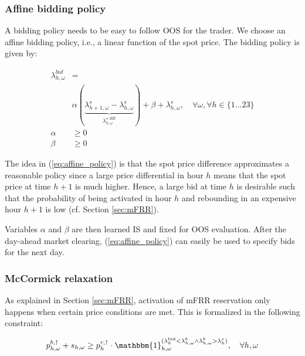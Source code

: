 \subsubsection{Affine bidding policy}

A bidding policy needs to be easy to follow OOS for the trader. We choose an affine bidding policy, i.e., a linear function of the spot price. The bidding policy is given by:

\begin{subequations}\label{eq:affine_policy}
    \begin{align}
        \lambda^{bid}_{h,\omega}           & = \label{affine_policy:1} \\  
        & \alpha ( \underbrace{\lambda_{h+1,\omega}^{s} - \lambda_{h,\omega}^{s}}_{\lambda_{h,\omega}^{s,\text{diff}}} ) + \beta + \lambda_{h,\omega}^{s}, \quad \forall{\omega}, \forall{h} \in \{1\ldots23\} \nonumber \\
        \alpha                             & \geq 0\label{affine_policy:2}                                                                                                                            \\
        \beta                              & \geq 0\label{affine_policy:3}
    \end{align}
\end{subequations}

The idea in (\ref{eq:affine_policy}) is that the spot price difference approximates a reasonable policy since a large price differential in hour $h$ means that the spot price at time $h+1$ is much higher. Hence, a large bid at time $h$ is desirable such that the probability of being activated in hour $h$ and rebounding in an expensive hour $h+1$ is low (cf. Section \ref{sec:mFRR}).

Variables $\alpha$ and $\beta$ are then learned IS and fixed for OOS evaluation. After the day-ahead market clearing, (\ref{eq:affine_policy}) can easily be used to specify bids for the next day.

\subsubsection{McCormick relaxation}\label{sec:mccormick}

As explained in Section \ref{sec:mFRR}, activation of mFRR reservation only happens when certain price conditions are met. This is formalized in the following constraint:

\begin{equation}\label{eq:bid_constraint}
    p^{b, \uparrow}_{h,\omega} + s_{h,\omega} \geq p^{r,\uparrow}_{h} \cdot \mathbbm{1}_{h,\omega}^{(\lambda^{\text{bid}}_{h} < \lambda^{b}_{h,\omega} \land \lambda^{b}_{h,\omega} > \lambda^{s}_{h})}, \quad \forall{h,\omega}
\end{equation}

